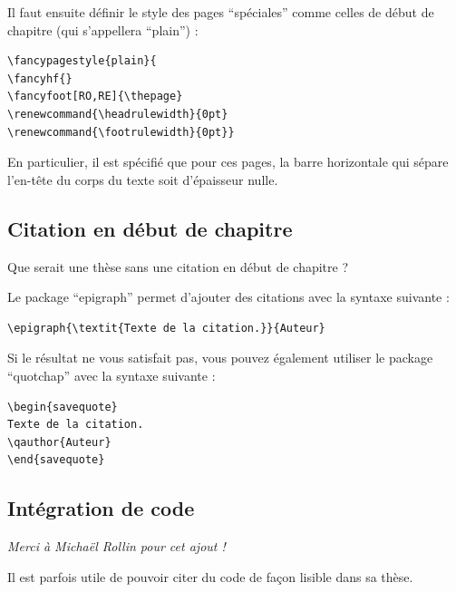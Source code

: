 Il faut ensuite définir le style des pages ``spéciales'' comme celles de début de chapitre (qui s'appellera ``plain'') :
\begin{verbatim}
\fancypagestyle{plain}{
\fancyhf{}
\fancyfoot[RO,RE]{\thepage}
\renewcommand{\headrulewidth}{0pt}
\renewcommand{\footrulewidth}{0pt}}
\end{verbatim}
\noindent En particulier, il est spécifié que pour ces pages, la barre horizontale qui sépare l'en-tête du corps du texte soit d'épaisseur nulle.

\subsection{Citation en début de chapitre}
\label{chap1:sec:exemple_epigraph}

Que serait une thèse sans une citation en début de chapitre ?\bigskip

\noindent Le package ``epigraph'' permet d'ajouter des citations avec la syntaxe suivante :
{\small \begin{verbatim}
\epigraph{\textit{Texte de la citation.}}{Auteur}
\end{verbatim}}
\noindent Si le résultat ne vous satisfait pas, vous pouvez également utiliser le package ``quotchap'' avec la syntaxe suivante :
{\small \begin{verbatim}
\begin{savequote}
Texte de la citation.
\qauthor{Auteur}
\end{savequote}
\end{verbatim}}

\subsection{Intégration de code}
\label{chap1:sec:exemple_code}

\noindent\textit{Merci à Michaël Rollin pour cet ajout !}\bigskip

Il est parfois utile de pouvoir citer du code de façon lisible dans sa thèse.\bigskip

